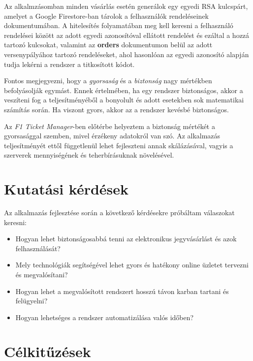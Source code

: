 Az alkalmzásomban minden vásárlás esetén generálok egy egyedi RSA kulcspárt, amelyet a Google Firestore-ban tárolok a felhasználók rendeléseinek dokumentumában. A hitelesítés folyamatában meg kell keresni a felhasználó rendelései között az adott egyedi azonosítóval ellátott rendelést és ezáltal a hozzá tartozó kulcsokat, valamint az \textbf{orders} dokumentumon belül az adott versenypályához tartozó rendeléseket, ahol hasonlóan az egyedi azonosító alapján tudja lekérni a rendszer a titkosított kódot.

Fontos megjegyezni, hogy a \textit{gyorsaság} és a \textit{biztonság} nagy mértékben befolyásolják egymást. Ennek értelmében, ha egy rendszer biztonságos, akkor a veszíteni fog a teljesítményéből a bonyolult és adott esetekben sok matematikai számítás során. Ha viszont gyors, akkor az a rendszer kevésbé biztonságos.

Az \textit{F1 Ticket Manager}-ben előtérbe helyeztem a biztonság mértékét a gyorsasággal szemben, mivel érzékeny adatokról van szó. Az alkalmazás teljesítményét ettől függetlenül lehet fejleszteni annak skálázásával, vagyis a szerverek mennyiségének és teherbírásuknak növelésével.

\section {Kutatási kérdések} \label{research}

Az alkalmazás fejlesztése során a következő kérdésekre próbáltam válaszokat keresni:
\begin{itemize}
	\item Hogyan lehet biztonságosabbá tenni az elektronikus jegyvásárlást és azok felhasználását?
	\item Mely technológiák segítségével lehet gyors és hatékony online üzletet tervezni és megvalósítani?
	\item Hogyan lehet a megvalósított rendszert hosszú távon karban tartani és felügyelni?
	\item Hogyan lehetséges a rendszer automatizálása valós időben?
\end{itemize}

\section {Célkitűzések} \label{scopes}

